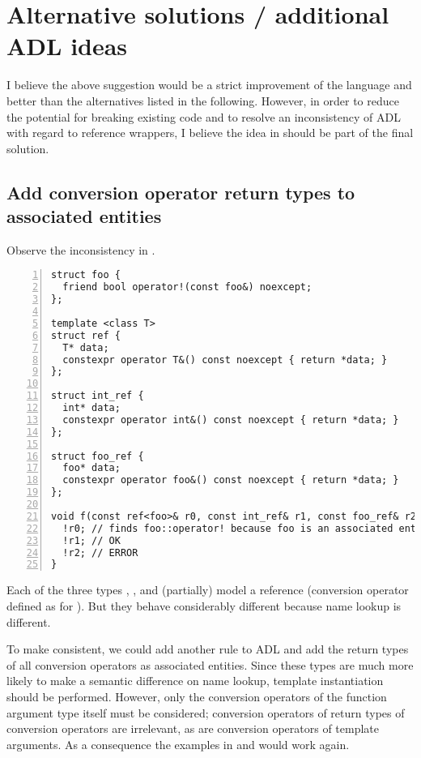 \section{Alternative solutions / additional ADL ideas}

I believe the above suggestion would be a strict improvement of the \CC{} language and 
better than the alternatives listed in the following. However, in order to reduce the 
potential for breaking existing code and to resolve an inconsistency of ADL with regard to 
reference wrappers, I believe the idea in  should be part of the final 
solution.

\subsection{Add conversion operator return types to associated entities}
\label{sec:convopadl}

Observe the inconsistency in .
\begin{lstlisting}[style=Vc,numbers=left,float={hbtp},label=lst:motivateADLconvop,caption={
Different name lookup for three reference types that should be equivalent 
(\url{https://godbolt.org/z/83fqT76vn})
}]
struct foo {
  friend bool operator!(const foo&) noexcept;
};

template <class T>
struct ref {
  T* data;
  constexpr operator T&() const noexcept { return *data; }
};

struct int_ref {
  int* data;
  constexpr operator int&() const noexcept { return *data; }
};

struct foo_ref {
  foo* data;
  constexpr operator foo&() const noexcept { return *data; }
};

void f(const ref<foo>& r0, const int_ref& r1, const foo_ref& r2) {
  !r0; // finds foo::operator! because foo is an associated entity
  !r1; // OK
  !r2; // ERROR
}
\end{lstlisting}
Each of the three types , , and  (partially) 
model a reference (conversion operator defined as for ). 
But they behave considerably different because name lookup is different.

To make  consistent, we could add another rule to ADL and add the 
return types of all conversion operators as associated entities. Since these types are 
much more likely to make a semantic difference on name lookup, template instantiation 
should be performed. However, only the conversion operators of the function argument type 
itself must be considered; conversion operators of return types of conversion operators 
are irrelevant, as are conversion operators of template arguments. As a consequence the 
examples in  and  would work again.

